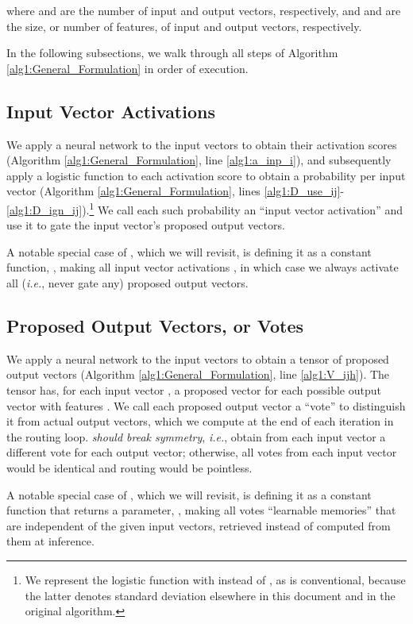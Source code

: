 \documentclass[11pt,a4paper]{article}
\begin{document}
where  and  are the number of input and output vectors, respectively, and  and  are the size, or number of features, of input and output vectors, respectively.

In the following subsections, we walk through all steps of Algorithm \ref{alg1:General_Formulation} in order of execution.

\subsection{Input Vector Activations}\label{ssec:a_inp_i}

We apply a neural network  to the input vectors to obtain their activation scores  (Algorithm \ref{alg1:General_Formulation}, line \ref{alg1:a_inp_i}), and subsequently apply a logistic function  to each activation score to obtain a probability per input vector  (Algorithm \ref{alg1:General_Formulation}, lines \ref{alg1:D_use_ij}-\ref{alg1:D_ign_ij}).\footnote{
	We represent the logistic function with  instead of , as is conventional, because the latter denotes standard deviation elsewhere in this document and in the original algorithm.
} We call each such probability an ``input vector activation'' and use it to gate the input vector's proposed output vectors.

A notable special case of , which we will revisit, is defining it as a constant function, , making all input vector activations , in which case we always activate all ({\em i.e.}, never gate any) proposed output vectors.

\subsection{Proposed Output Vectors, or Votes}\label{ssec:V_ijh}

We apply a neural network  to the input vectors to obtain a tensor of proposed output vectors  (Algorithm \ref{alg1:General_Formulation}, line \ref{alg1:V_ijh}). The tensor  has, for each input vector , a proposed vector for each possible output vector  with features . We call each proposed output vector a ``vote'' to distinguish it from actual output vectors, which we compute at the end of each iteration in the routing loop.  {\em should break symmetry}, {\em i.e.}, obtain from each input vector a different vote for each output vector; otherwise, all votes from each input vector  would be identical and routing would be pointless.

A notable special case of , which we will revisit, is defining it as a constant function that returns a parameter, , making all votes ``learnable memories'' that are independent of the given input vectors, retrieved instead of computed from them at inference.
\end{document}
